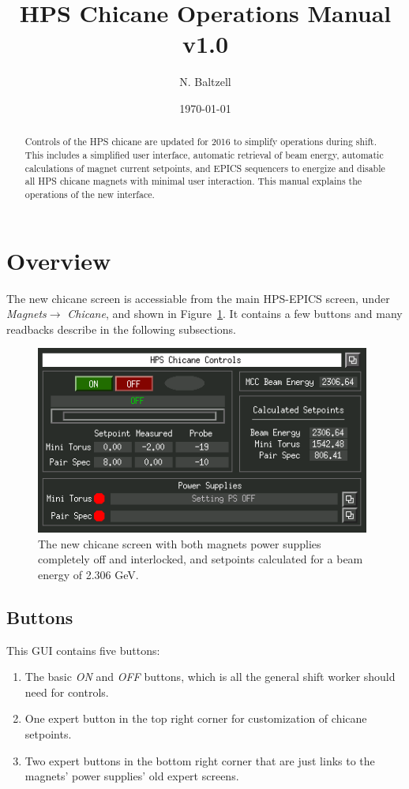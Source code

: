 \documentclass[amsmath,amssymb,notitlepage,12pt]{revtex4-1}
\begin{document}
\title{HPS Chicane Operations Manual v1.0}
\author{N. Baltzell}
\date{\today}
\begin{abstract}
Controls of the HPS chicane are updated for 2016 to simplify operations during shift.  This includes a simplified user interface, automatic retrieval of beam energy, automatic calculations of magnet current setpoints, and EPICS sequencers to energize and disable all HPS chicane magnets with minimal user interaction.  This manual explains the operations of the new interface. 
\end{abstract}

\maketitle
\tableofcontents
\newpage

\section{Overview}
The new chicane screen is accessiable from the main HPS-EPICS screen, under {\em Magnets}$ \to$ {\em Chicane}, and shown in Figure~\ref{fig:guiChicaneOff}.  It contains a few buttons and many readbacks describe in the following subsections. 
\begin{figure}[htbp]\centering
    \includegraphics[width=11cm]{pics/gui2}
    \caption{The new chicane screen with both magnets power supplies completely off and interlocked, and setpoints calculated for a beam energy of 2.306 GeV.\label{fig:guiChicaneOff}}
\end{figure}
\subsection{Buttons}
This GUI contains five buttons:
\begin{enumerate}
    \item The basic {\em ON} and {\em OFF} buttons, which is all the general shift worker should need for controls.
    \item One expert button in the top right corner for customization of chicane setpoints.
    \item Two expert buttons in the bottom right corner that are just links to the magnets' power supplies' old expert screens.
\end{enumerate}
\end{document}
